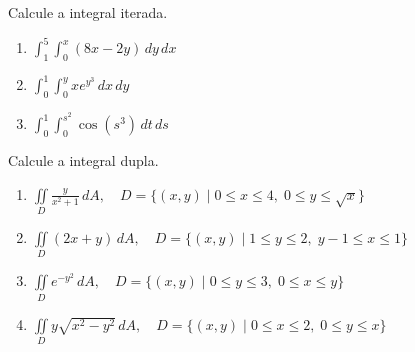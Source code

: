 \documentclass[a4paper, 12pt]{article}
\begin{document}
	
	\vspace{5mm}
	
	Calcule a integral iterada.
	
	\begin{enumerate}
		
		\item $\displaystyle \int_{1}^{5} \int_{0}^{x} (8x - 2y) \, dy \, dx$ 
		
		\item $\displaystyle \int_{0}^{1} \int_{0}^{y} xe^{y^{3}} \, dx \, dy$ 
		
		\item $\displaystyle \int_{0}^{1} \int_{0}^{s^{2}} \cos(s^{3}) \, dt \, ds$ 
		
		
	\end{enumerate}
	
	\vspace{5mm}
	
	Calcule a integral dupla.
	
	\begin{enumerate}[resume]
	
		\item $\displaystyle \iint \limits_{D} \frac{y}{x^2 + 1} \, dA, \quad D = \{ (x, y) \; | \; 0 \leq x \leq 4, \; 0 \leq y \leq \sqrt{x} \}$
		
		\item $\displaystyle \iint \limits_{D} (2x + y) \, dA, \quad D = \{ (x, y) \; | \; 1 \leq y \leq 2, \; y-1 \leq x \leq 1 \}$
		
		\item $\displaystyle \iint \limits_{D} e^{-y^2} \, dA, \quad D = \{ (x, y) \; | \; 0 \leq y \leq 3, \; 0 \leq x \leq y \}$
		
		\item $\displaystyle \iint \limits_{D} y \sqrt{x^2 - y^2} \, dA, \quad D = \{ (x, y) \; | \; 0 \leq x \leq 2, \; 0 \leq y \leq x \}$

	\end{enumerate}
	
	\vspace{5mm}
	
\end{document}
